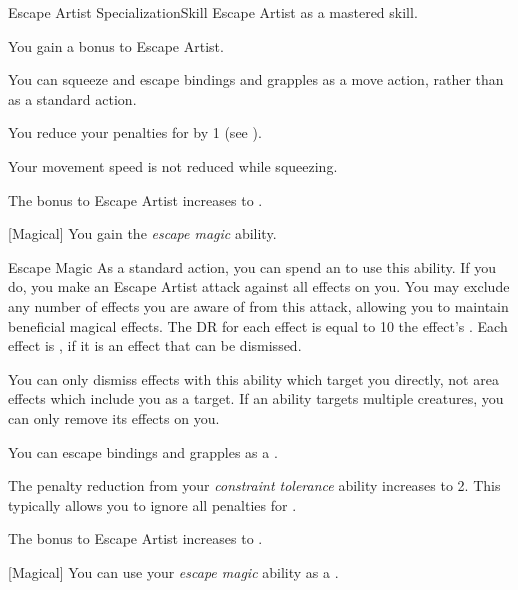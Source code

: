     \begin{feat}{Escape Artist Specialization}{Skill}
        \featpre Escape Artist as a mastered skill.

         You gain a  bonus to Escape Artist.

         You can squeeze and escape bindings and grapples as a move action, rather than as a standard action.

         You reduce your penalties for  by 1 (see ).

         Your movement speed is not reduced while squeezing.

         The bonus to Escape Artist increases to .

        [Magical] You gain the \textit{escape magic} ability.
        \begin{ability}{Escape Magic}
            As a standard action, you can spend an  to use this ability.
            If you do, you make an Escape Artist attack against all  effects on you.
            You may exclude any number of effects you are aware of from this attack, allowing you to maintain beneficial magical effects.
            The DR for each effect is equal to 10 \add the effect's .
            \hit Each effect is , if it is an effect that can be dismissed.
        \end{ability}

        You can only dismiss effects with this ability which target you directly, not area effects which include you as a target.
        If an ability targets multiple creatures, you can only remove its effects on you.

         You can escape bindings and grapples as a .

         The penalty reduction from your \textit{constraint tolerance} ability increases to 2.
        This typically allows you to ignore all penalties for .

         The bonus to Escape Artist increases to .

        [Magical] You can use your \textit{escape magic} ability as a .
    \end{feat}

